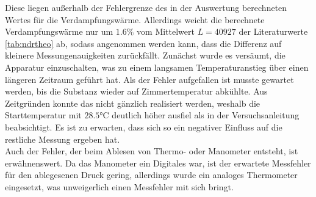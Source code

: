 \noindent Diese liegen außerhalb der Fehlergrenze des in der Auswertung berechneten Wertes für die 
Verdampfungswärme. Allerdings weicht die berechnete Verdampfungswärme nur um $1.6 \%$ vom 
Mittelwert $L= 40927$ der Literaturwerte \ref{tab:ndrtheo}
ab, sodass angenommen werden kann, dass die Differenz auf kleinere Messungenauigkeiten zurückfällt.
Zunächst wurde es versäumt, die Apparatur einzuschalten, was zu einem langsamen Temperaturanstieg über einen längeren Zeitraum geführt hat. Als der Fehler aufgefallen
ist musste gewartet werden, bis die Substanz wieder auf Zimmertemperatur abkühlte. Aus Zeitgründen konnte das nicht gänzlich realisiert werden, weshalb die Starttemperatur 
mit $ 28.5 \si{\degreeCelsius}$ deutlich höher ausfiel als in der Versuchsanleitung beabsichtigt. Es ist zu erwarten, dass sich so ein negativer Einfluss auf die restliche Messung
ergeben hat. \\
Auch der Fehler, der beim Ablesen von Thermo- oder Manometer entsteht, ist erwähnenswert. Da das Manometer ein Digitales war, ist der erwartete Messfehler für den ablegesenen 
Druck gering, allerdings wurde ein analoges Thermometer eingesetzt, was unweigerlich einen Messfehler mit sich bringt.

